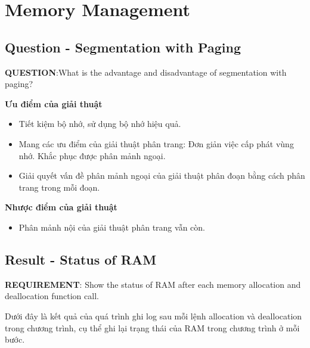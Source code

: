 
\section{Memory Management}

\subsection{Question - Segmentation with Paging}

\vspace{0.5cm}

\textbf{QUESTION}:What is the advantage and disadvantage of segmentation with paging?

\vspace{0.5cm}

\textbf{Ưu điểm của giải thuật}

\begin{itemize}
	\item Tiết kiệm bộ nhớ, sử dụng bộ nhớ hiệu quả.
	\item Mang các ưu điểm của giải thuật phân trang:
	\subitem Đơn giản việc cấp phát vùng nhớ.
	\subitem Khắc phục được phân mảnh ngoại.
	\item Giải quyết vấn đề phân mảnh ngoại của giải thuật phân đoạn bằng cách phân trang trong mỗi đoạn.
\end{itemize}

\vspace{0.2cm}

\textbf{Nhược điểm của giải thuật}

\begin{itemize}
	\item Phân mảnh nội của giải thuật phân trang vẫn còn.
\end{itemize}

\vspace{0.2cm}

\subsection{Result - Status of RAM}

\vspace{0.5cm}

\textbf{REQUIREMENT}: Show the status of RAM after each memory allocation and deallocation function call.

\vspace{0.5cm}


Dưới đây là kết quả của quá trình ghi log sau mỗi lệnh allocation và deallocation trong chương trình, cụ thể ghi lại trạng thái của RAM trong chương trình ở mỗi bước.


